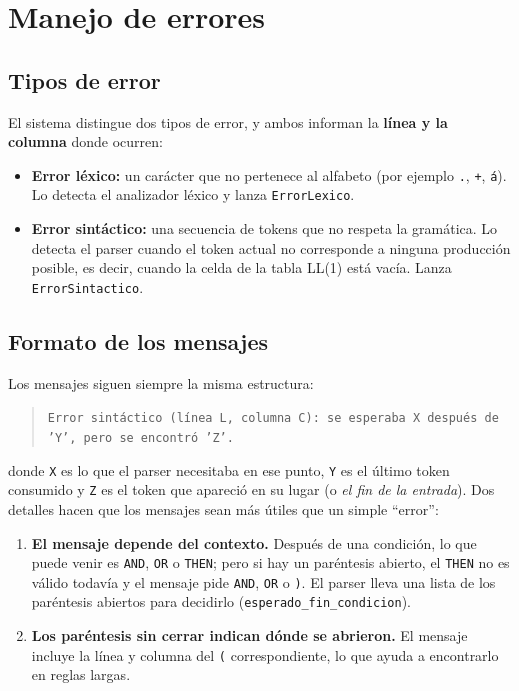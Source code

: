 \section{Manejo de errores}

\subsection{Tipos de error}

El sistema distingue dos tipos de error, y ambos informan la \textbf{línea y la columna} donde ocurren:

\begin{itemize}
    \item \textbf{Error léxico:} un carácter que no pertenece al alfabeto (por ejemplo \texttt{.}, \texttt{+}, \texttt{á}). Lo detecta el analizador léxico y lanza \texttt{ErrorLexico}.
    \item \textbf{Error sintáctico:} una secuencia de tokens que no respeta la gramática. Lo detecta el parser cuando el token actual no corresponde a ninguna producción posible, es decir, cuando la celda de la tabla LL(1) está vacía. Lanza \texttt{ErrorSintactico}.
\end{itemize}

\subsection{Formato de los mensajes}

Los mensajes siguen siempre la misma estructura:

\begin{quote}
\texttt{Error sintáctico (línea L, columna C): se esperaba X después de 'Y', pero se encontró 'Z'.}
\end{quote}

donde \texttt{X} es lo que el parser necesitaba en ese punto, \texttt{Y} es el último token consumido y \texttt{Z} es el token que apareció en su lugar (o \emph{el fin de la entrada}). Dos detalles hacen que los mensajes sean más útiles que un simple ``error'':

\begin{enumerate}
    \item \textbf{El mensaje depende del contexto.} Después de una condición, lo que puede venir es \texttt{AND}, \texttt{OR} o \texttt{THEN}; pero si hay un paréntesis abierto, el \texttt{THEN} no es válido todavía y el mensaje pide \texttt{AND}, \texttt{OR} o \texttt{)}. El parser lleva una lista de los paréntesis abiertos para decidirlo (\texttt{esperado\_fin\_condicion}).
    \item \textbf{Los paréntesis sin cerrar indican dónde se abrieron.} El mensaje incluye la línea y columna del \texttt{(} correspondiente, lo que ayuda a encontrarlo en reglas largas.
\end{enumerate}

